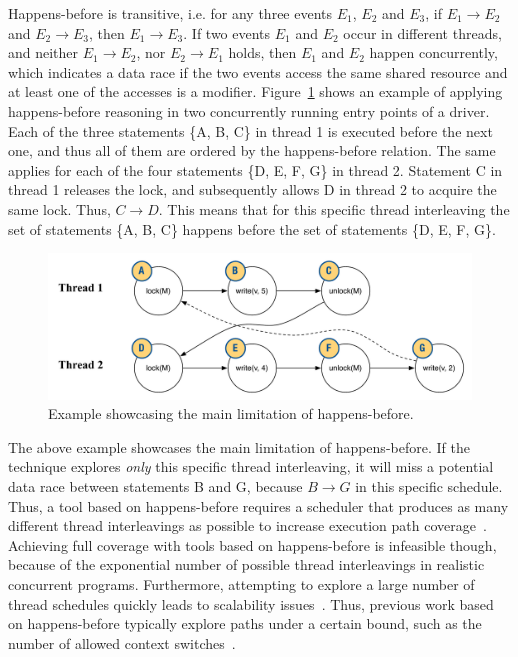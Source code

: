 Happens-before is transitive, i.e. for any three events $E_1$, $E_2$ and $E_3$, if $E_1 \rightarrow E_2$ and $E_2 \rightarrow E_3$, then $E_1 \rightarrow E_3$. If two events $E_1$ and $E_2$ occur in different threads, and neither $E_1 \rightarrow E_2$, nor $E_2 \rightarrow E_1$ holds, then $E_1$ and $E_2$ happen concurrently, which indicates a data race if the two events access the same shared resource and at least one of the accesses is a modifier. Figure~\ref{happens_before} shows an example of applying happens-before reasoning in two concurrently running entry points of a driver. Each of the three statements \{A, B, C\} in thread 1 is executed before the next one, and thus all of them are ordered by the happens-before relation. The same applies for each of the four statements \{D, E, F, G\} in thread 2. Statement C in thread 1 releases the lock, and subsequently allows D in thread 2 to acquire the same lock. Thus, $C \rightarrow D$. This means that for this specific thread interleaving the set of statements \{A, B, C\} happens before the set of statements \{D, E, F, G\}.

\begin{figure}[htbp]
\centering
\includegraphics[width=.95\linewidth]{img/happens_before.pdf}
\caption{Example showcasing the main limitation of happens-before.}
\label{happens_before}
\end{figure}

The above example showcases the main limitation of happens-before. If the technique explores \emph{only} this specific thread interleaving, it will miss a potential data race between statements B and G, because $B \rightarrow G$ in this specific schedule. Thus, a tool based on happens-before requires a scheduler that produces as many different thread interleavings as possible to increase execution path coverage~\cite{savage1997eraser}. Achieving full coverage with tools based on happens-before is infeasible though, because of the exponential number of possible thread interleavings in realistic concurrent programs. Furthermore, attempting to explore a large number of thread schedules quickly leads to scalability issues~\cite{musuvathi2008finding}. Thus, previous work based on happens-before typically explore paths under a certain bound, such as the number of allowed context switches~\cite{qadeer2004kiss}.